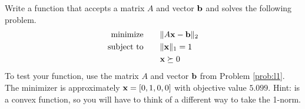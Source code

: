 \begin{problem}
Write a function that accepts  a matrix $A$ and vector $\mathbf{b}$ and solves the following problem.
\begin{align*}
\text{minimize}\qquad &\|A\mathbf{x} - \mathbf{b}\|_2\\
\text{subject to}\qquad &\|\mathbf{x}\|_1 = 1\\
		&\mathbf{x} \succeq 0\\
\end{align*}
To test your function, use the matrix $A$ and vector $\mathbf{b}$ from Problem \ref{prob:l1}. 
The minimizer is approximately $\mathbf{x}=[0, 1, 0, 0]$ with objective value $5.099$.
Hint:  is a convex function, so you will have to think of a different way to take the 1-norm.
\end{problem}
\begin{comment}
\begin{problem} %
The $l_2$ maximization problem is to
\begin{align*}
\text{maximize}\qquad &\|\x\|_2\\
\text{subject to} \qquad &A\x = \b.
\end{align*}

This problem is equivalent to a quadratic program, since $\|\x\|_2 = \x\trp \x$.
Write a function that accepts a matrix $A$ and vector $\b$ and solves the $l_2$ maximization problem.
Return the maximizer $\x$ and the primal objective value.

To test your function, use the matrix $A$ and vector $\b$ from Problem \ref{prob:l1}. 
The minimizer is approximately $\x=[0.966, 2.169, 0.809, 0.888]^T$ and the minimum primal objective value is approximately $7.079$.
\end{problem}
\end{comment}
